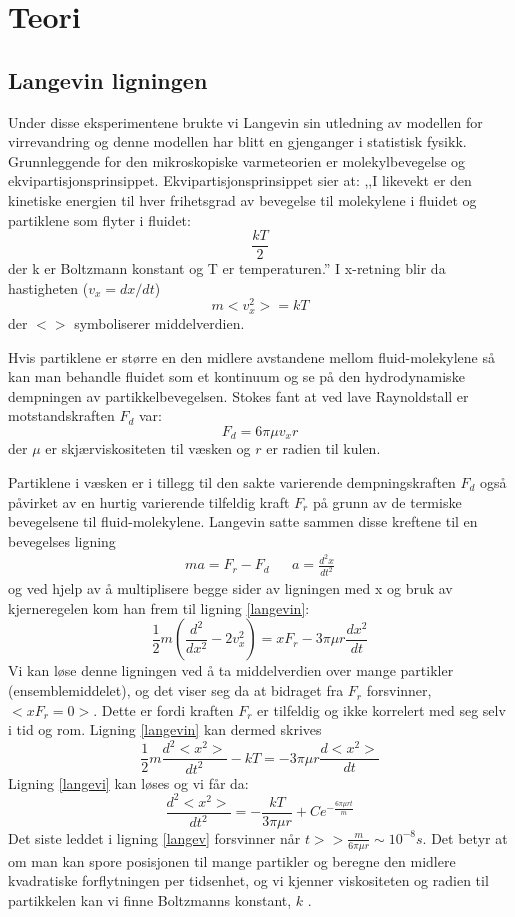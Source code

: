 \documentclass[norsk,a4paper,12pt]{article}
\begin{document}
\section{Teori}
\subsection{Langevin ligningen}
Under disse eksperimentene brukte vi Langevin sin utledning av modellen for virrevandring og denne modellen har blitt en gjenganger i statistisk fysikk. Grunnleggende for den mikroskopiske varmeteorien er molekylbevegelse og ekvipartisjonsprinsippet. Ekvipartisjonsprinsippet sier at: ,,I likevekt er den kinetiske energien til hver frihetsgrad av bevegelse til molekylene i fluidet og partiklene som flyter i fluidet:
$$
\frac{kT}{2}
$$
der k er Boltzmann konstant og T er temperaturen.'' I x-retning blir da hastigheten ($v_x=dx/dt$) 
$$
m<v_x^2>=kT
$$
der $< >$ symboliserer middelverdien.

Hvis partiklene er større en den midlere avstandene mellom fluid-molekylene så kan man behandle fluidet som et kontinuum og se på den hydrodynamiske dempningen av partikkelbevegelsen. Stokes fant at ved lave Raynoldstall er motstandskraften $F_d$ var:
\begin{equation}
F_d = 6\pi\mu v_xr
\label{Fd}
\end{equation}
der $\mu$ er skjærviskositeten til væsken og $r$ er radien til kulen.

Partiklene i væsken er i tillegg til den sakte varierende dempningskraften $F_d$ også påvirket av en hurtig varierende tilfeldig kraft $F_r$ på grunn av de termiske bevegelsene til fluid-molekylene. Langevin satte sammen disse kreftene til en bevegelses ligning
\begin{align*}
ma = F_r-F_d && a = \frac{d^2x}{dt^2}
\end{align*}
 og ved hjelp av å multiplisere begge sider av ligningen med x og bruk av kjerneregelen kom han frem til ligning \vref{langevin}:
\begin{equation}
\frac{1}{2}m\left(\frac{d^2}{dx^2} - 2v_x^2 \right) = xF_r-3\pi\mu r\frac{dx^2}{dt}
\label{langevin}
\end{equation} 
Vi kan løse denne ligningen ved å ta middelverdien over mange partikler (ensemblemiddelet), og det viser seg da at bidraget fra $F_r$ forsvinner, $<xF_r = 0>$. Dette er fordi kraften $F_r$ er tilfeldig og ikke korrelert med seg selv i tid og rom. Ligning \vref{langevin} kan dermed skrives 
\begin{equation}
\frac{1}{2}m\frac{d^2<x^2>}{dt^2}-kT = -3\pi\mu r\frac{d<x^2>}{dt}
\label{langevi}
\end{equation}
Ligning \vref{langevi} kan løses og vi får da:
\begin{equation}
\frac{d^2<x^2>}{dt^2} = -\frac{kT}{3\pi\mu r} + Ce^{-\frac{6\pi\mu rt}{m}}
\label{langev}
\end{equation}
Det siste leddet i ligning \vref{langev} forsvinner når $t>> \frac{m}{6\pi\mu r} \sim 10^{-8}s$. Det betyr at om man kan spore posisjonen til mange partikler og beregne den midlere kvadratiske forflytningen per tidsenhet, og vi kjenner viskositeten og radien til partikkelen kan vi finne Boltzmanns konstant, $k$ \cite{opg}.
\end{document}
